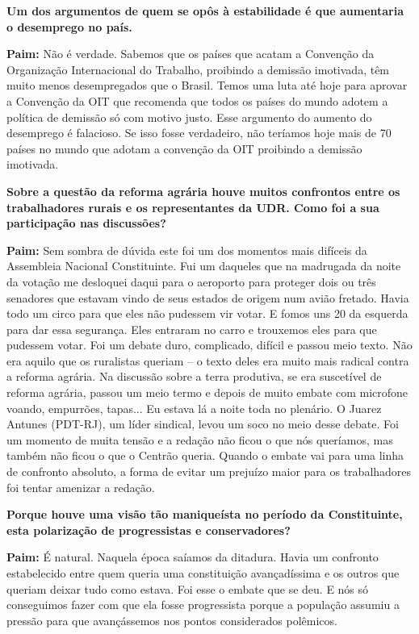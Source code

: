 \textbf{Um dos argumentos de quem se opôs à estabilidade é que
aumentaria o desemprego no país.}

\textbf{Paim:} Não é verdade. Sabemos que os países que acatam a
Convenção da Organização Internacional do Trabalho, proibindo a demissão
imotivada, têm muito menos desempregados que o Brasil. Temos uma luta
até hoje para aprovar a Convenção da OIT que recomenda que todos os
países do mundo adotem a política de demissão só com motivo justo. Esse
argumento do aumento do desemprego é falacioso. Se isso fosse
verdadeiro, não teríamos hoje mais de 70 países no mundo que adotam a
convenção da OIT proibindo a demissão imotivada.

\textbf{Sobre a questão da reforma agrária houve muitos confrontos entre
os trabalhadores rurais e os representantes da UDR. Como foi a sua
participação nas discussões?}

\textbf{Paim:} Sem sombra de dúvida este foi um dos momentos mais
difíceis da Assembleia Nacional Constituinte. Fui um daqueles que na
madrugada da noite da votação me desloquei daqui para o aeroporto para
proteger dois ou três senadores que estavam vindo de seus estados de
origem num avião fretado. Havia todo um circo para que eles não pudessem
vir votar. E fomos uns 20 da esquerda para dar essa segurança. Eles
entraram no carro e trouxemos eles para que pudessem votar. Foi um
debate duro, complicado, difícil e passou meio texto. Não era aquilo que
os ruralistas queriam -- o texto deles era muito mais radical contra a
reforma agrária. Na discussão sobre a terra produtiva, se era suscetível
de reforma agrária, passou um meio termo e depois de muito embate com
microfone voando, empurrões, tapas... Eu estava lá a noite toda no
plenário. O Juarez Antunes (PDT-RJ), um líder sindical, levou um soco no
meio desse debate. Foi um momento de muita tensão e a redação não ficou
o que nós queríamos, mas também não ficou o que o Centrão queria. Quando
o embate vai para uma linha de confronto absoluto, a forma de evitar um
prejuízo maior para os trabalhadores foi tentar amenizar a redação.

\textbf{Porque houve uma visão tão maniqueísta no período da
Constituinte, esta polarização de progressistas e conservadores?}

\textbf{Paim:} É natural. Naquela época saíamos da ditadura. Havia um
confronto estabelecido entre quem queria uma constituição avançadíssima
e os outros que queriam deixar tudo como estava. Foi esse o embate que
se deu. E nós só conseguimos fazer com que ela fosse progressista porque
a população assumiu a pressão para que avançássemos nos pontos
considerados polêmicos.

